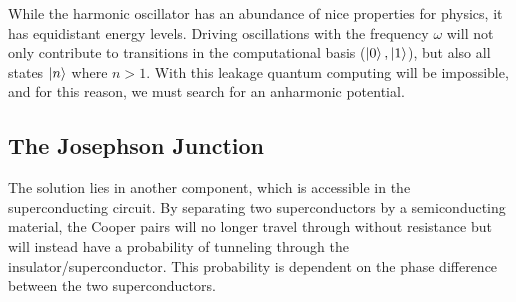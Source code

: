 While the harmonic oscillator has an abundance of nice properties for physics, it has equidistant energy levels. Driving oscillations with the frequency $\omega$ will not only contribute to transitions in the computational basis ($\ket{0}, \ket{1}$), but also all states $\ket{n}$ where $n > 1$. With this leakage quantum computing will be impossible, and for this reason, we must search for an anharmonic potential.

\subsection{The Josephson Junction}
The solution lies in another component, which is accessible in the superconducting circuit. By separating two superconductors by a semiconducting material, the Cooper pairs will no longer travel through without resistance but will instead have a probability of tunneling through the insulator/superconductor. This probability is dependent on the phase difference between the two superconductors. 
